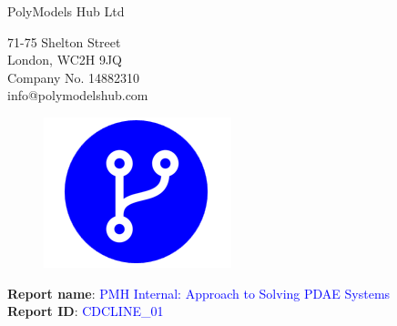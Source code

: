 \documentclass{article}
\begin{document}
\thispagestyle{firstpage}
\vspace*{-0.9cm}
\begin{minipage}{0.9\textwidth}
    {\huge \color{blue} PolyModels Hub Ltd}
    \\
    \vspace{-0.15cm}

    71-75 Shelton Street
    \\
    London, WC2H 9JQ
    \\
    Company No. 14882310
    \\
    info@polymodelshub.com
    \\
\end{minipage}
\begin{minipage}{0.115\textwidth}
    \begin{figure}[H]
        \vspace{-0.5cm}\includegraphics[width=\textwidth]{PMHlogo.png}
    \end{figure}
\end{minipage}
\vspace{0.5cm}

\begin{minipage}{1\textwidth}
    \textbf{Report name}: \textcolor{blue}{ \large PMH Internal: Approach to Solving PDAE Systems} \\
    \textbf{Report ID}: \textcolor{blue}{ CDCLINE\_01 }\\

\end{minipage}%

\vspace{0.0cm}
\end{document}
